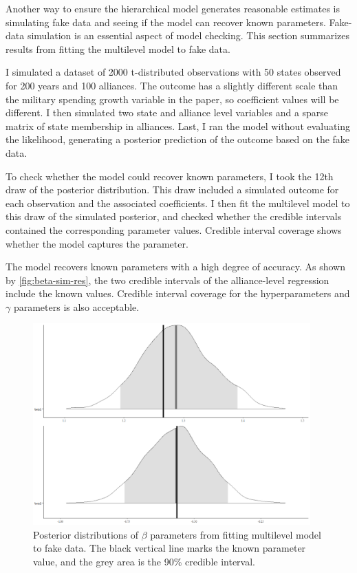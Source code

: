 \documentclass[12pt]{article}
\begin{document}
Another way to ensure the hierarchical model generates reasonable estimates is simulating fake data and seeing if the model can recover known parameters. 
Fake-data simulation is an essential aspect of model checking. 
This section summarizes results from fitting the multilevel model to fake data.


I simulated a dataset of 2000 t-distributed observations with 50 states observed for 200 years and 100 alliances. 
The outcome has a slightly different scale than the military spending growth variable in the paper, so coefficient values will be different. 
I then simulated two state and alliance level variables and a sparse matrix of state membership in alliances. 
Last, I ran the model without evaluating the likelihood, generating a posterior prediction of the outcome based on the fake data.


To check whether the model could recover known parameters, I took the 12th draw of the posterior distribution.
This draw included a simulated outcome for each observation and the associated coefficients. 
I then fit the multilevel model to this draw of the simulated posterior, and checked whether the credible intervals contained the corresponding parameter values. 
Credible interval coverage shows whether the model captures the parameter. 


The model recovers known parameters with a high degree of accuracy. 
As shown by \autoref{fig:beta-sim-res}, the two credible intervals of the alliance-level regression include the known values.
Credible interval coverage for the hyperparameters and $\gamma$ parameters is also acceptable. 


\begin{figure}[htbp]
	\centering
		\includegraphics[width=0.95\textwidth]{beta-sim-res.png}
	\caption{Posterior distributions of $\beta$ parameters from fitting multilevel model to fake data. The black vertical line marks the known parameter value, and the grey area is the 90\% credible interval.}
	\label{fig:beta-sim-res}
\end{figure}
\end{document}
